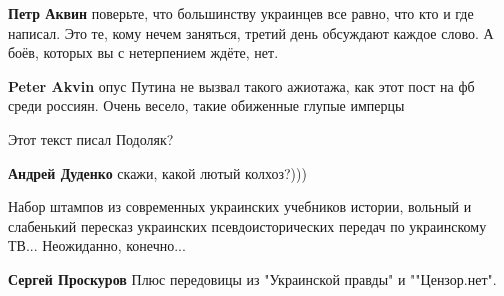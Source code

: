 \begin{itemize}
\begin{itemize}
\textbf{Петр Аквин} поверьте, что большинству украинцев все равно, что кто и где написал. Это те, кому нечем заняться, третий день обсуждают каждое слово. А боёв, которых вы с нетерпением ждёте, нет.

 
\textbf{Peter Akvin} опус Путина не вызвал такого ажиотажа, как этот пост на фб среди россиян. Очень весело, такие обиженные глупые имперцы
\end{itemize}

 
Этот текст писал Подоляк?

\begin{itemize}
 
\textbf{Андрей Дуденко} скажи, какой лютый колхоз?)))
\end{itemize}

 

Набор штампов из современных украинских учебников истории, вольный и слабенький
пересказ украинских псевдоисторических передач по украинскому ТВ... Неожиданно,
конечно...

\begin{itemize}
 
\textbf{Сергей Проскуров} Плюс передовицы из "Украинской правды" и ""Цензор.нет".
\end{itemize}

 

\end{itemize}
